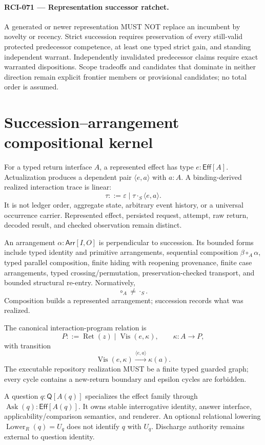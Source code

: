 \documentclass[11pt]{article}
\begin{document}
\paragraph{RCI-071 --- Representation successor ratchet.}
A generated or newer representation MUST NOT replace an incumbent by novelty or
recency. Strict succession requires preservation of every still-valid protected
predecessor competence, at least one typed strict gain, and standing independent
warrant. Independently invalidated predecessor claims require exact warranted
dispositions. Scope tradeoffs and candidates that dominate in neither direction
remain explicit frontier members or provisional candidates; no total order is
assumed.

\section{Succession--arrangement compositional kernel}

For a typed return interface $A$, a represented effect has type
$e:\mathsf{Eff}[A]$. Actualization produces a dependent pair
$\langle e,a\rangle$ with $a:A$. A binding-derived realized interaction trace is linear:
\[
 \tau ::= \varepsilon \mid \tau\mathbin{\cdot_S}\langle e,a\rangle.
\]
It is not ledger order, aggregate state, arbitrary event history, or a universal
occurrence carrier. Represented effect, persisted request, attempt, raw return, decoded
result, and checked observation remain distinct.

An arrangement $\alpha:\mathsf{Arr}[I,O]$ is perpendicular to succession. Its bounded
forms include typed identity and primitive arrangements, sequential composition
$\beta\circ_A\alpha$, typed parallel composition, finite hiding with reopening
provenance, finite case arrangements, typed crossing/permutation, preservation-checked
transport, and bounded structural re-entry. Normatively,
\[
 \circ_A\neq\cdot_S.
\]
Composition builds a represented arrangement; succession records what was realized.

The canonical interaction-program relation is
\[
 P ::= \operatorname{Ret}(z)\mid\operatorname{Vis}(e,\kappa),
 \qquad \kappa:A\to P,
\]
with transition
\[
 \operatorname{Vis}(e,\kappa)\xrightarrow{\langle e,a\rangle}\kappa(a).
\]
The executable repository realization MUST be a finite typed guarded graph; every cycle
contains a new-return boundary and epsilon cycles are forbidden.

A question $q:\mathsf Q[A(q)]$ specializes the effect family through
$\operatorname{Ask}(q):\mathsf{Eff}[A(q)]$. It owns stable interrogative identity,
answer interface, applicability/comparison semantics, and renderer. An optional
relational lowering $\operatorname{Lower}_R(q)=U_q$ does not identify $q$ with $U_q$.
Discharge authority remains external to question identity.
\end{document}
